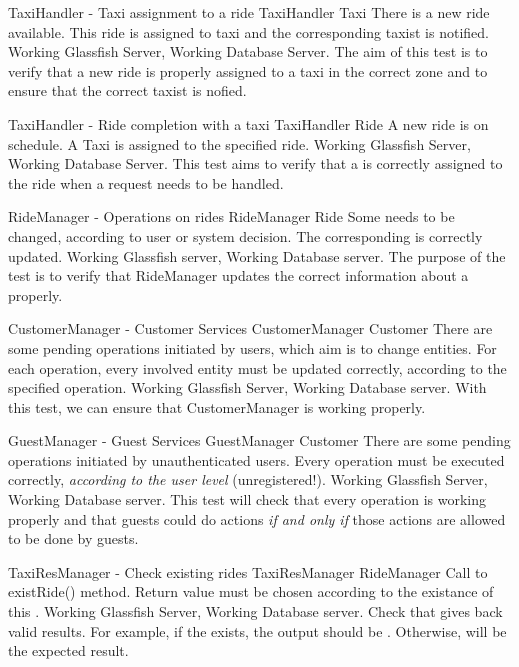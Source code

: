 \testx
{TaxiHandler - Taxi assignment to a ride}
{TaxiHandler}
{Taxi}
{There is a new ride available.}
{This ride is assigned to taxi and the corresponding taxist is notified.}
{Working Glassfish Server, Working Database Server.}
{The aim of this test is to verify that a new ride is properly assigned to 
a taxi in the correct zone and to ensure that the correct taxist is nofied.}

\testx
{TaxiHandler - Ride completion with a taxi}
{TaxiHandler}
{Ride}
{A new ride is on schedule.}
{A Taxi is assigned to the specified ride.}
{Working Glassfish Server, Working Database Server.}
{This test aims to verify that a  is correctly assigned to the ride
when a request needs to be handled.}

\testx
{RideManager - Operations on rides}
{RideManager}
{Ride}
{Some  needs to be changed, according to user or system decision.}
{The corresponding  is correctly updated.}
{Working Glassfish server, Working Database server.}
{The purpose of the test is to verify that RideManager updates the correct
information about a  properly.}

\testx
{CustomerManager - Customer Services}
{CustomerManager}
{Customer}
{There are some pending operations initiated by users, which aim is to change
 entities.}
{For each operation, every involved  entity must be updated correctly, 
according to the specified operation.}
{Working Glassfish Server, Working Database server.}
{With this test, we can ensure that CustomerManager is working properly.}

\testx
{GuestManager - Guest Services}
{GuestManager}
{Customer}
{There are some pending operations initiated by unauthenticated users.}
{Every operation must be executed correctly, \emph{according to the user level} 
(unregistered!).}
{Working Glassfish Server, Working Database server.}
{This test will check that every  operation is working properly
and that guests could do actions \emph{if and only if} those actions are allowed
to be done by guests.}

\testx
{TaxiResManager - Check existing rides}
{TaxiResManager}
{RideManager}
{Call to existRide() method.}
{Return value must be chosen according to the existance of this .}
{Working Glassfish Server, Working Database server.}
{Check that  gives back valid results. For example, if 
the  exists, the output should be . Otherwise, 
 will be the expected result.}

